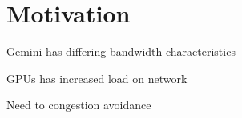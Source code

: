 \section{Motivation}

Gemini has differing bandwidth characteristics

GPUs has increased load on network

Need to congestion avoidance

